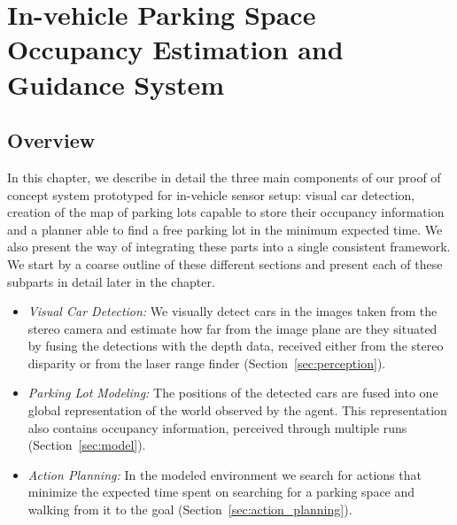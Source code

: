 
\newcommand\Bx{x}
\newcommand\Bm{m}
\def\v{\vm{v}}
\newcommand\vm[1]{\bm{\mathrm{#1}}}
\renewcommand{\v}{{\mbox{a}^i}}
\newcommand{\z}{z_{t}}
\newcommand{\y}{z_{1:t-1}}

\chapter{In-vehicle Parking Space Occupancy Estimation and Guidance System}
\label{cha:our_approach}

\section{Overview} %
\label{sec:overview}

In this chapter, we describe in detail the three main components of our proof
of concept system prototyped for in-vehicle sensor setup: visual car
detection, creation of the map of parking lots capable to store their
occupancy information and a planner able to find a free parking lot in the
minimum expected time. We also present the way of integrating these parts into
a single consistent framework. We start by a coarse outline of these different
sections and present each of these subparts in detail later in the chapter.

\begin{itemize}

\item \emph{Visual Car Detection:}  We visually detect cars in the images taken from the
stereo camera and estimate how far from the image plane are they situated by
fusing the detections with the depth data, received either from the stereo
disparity or from the laser range finder (Section~\ref{sec:perception}).

\item \emph{Parking Lot Modeling:}  The positions of the detected cars are
fused into one global representation of the world observed by the agent. This
representation also contains occupancy information, perceived through multiple
runs (Section~\ref{sec:model}).

\item \emph{Action Planning:}  In the modeled environment we search for actions that
minimize the expected time spent on searching for a parking space and walking
from it to the goal (Section~\ref{sec:action_planning}).

\end{itemize}

